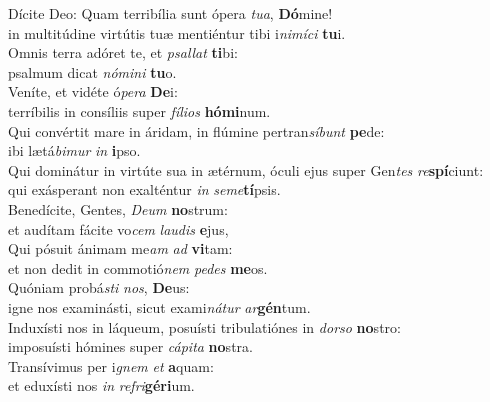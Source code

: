 \evenverse Dícite Deo: Quam terribília sunt ópera \textit{tu}\textit{a}, \textbf{Dó}mine!~\*\\
\evenverse in multitúdine virtútis tuæ mentiéntur tibi i\textit{ni}\textit{mí}\textit{ci} \textbf{tu}i.\\
\oddverse Omnis terra adóret te, et \textit{psal}\textit{lat} \textbf{ti}bi:~\*\\
\oddverse psalmum dicat \textit{nó}\textit{mi}\textit{ni} \textbf{tu}o.\\
\evenverse Veníte, et vidéte ó\textit{pe}\textit{ra} \textbf{De}i:~\*\\
\evenverse terríbilis in consíliis super \textit{fí}\textit{li}\textit{os} \textbf{hó}\textbf{mi}num.\\
\oddverse Qui convértit mare in áridam, in flúmine pertran\textit{sí}\textit{bunt} \textbf{pe}de:~\*\\
\oddverse ibi lætá\textit{bi}\textit{mur} \textit{in} \textbf{i}pso.\\
\evenverse Qui dominátur in virtúte sua in ætérnum, óculi ejus super Gen\textit{tes} \textit{re}\textbf{spí}ciunt:~\*\\
\evenverse qui exásperant non exalténtur \textit{in} \textit{se}\textit{me}\textbf{tí}psis.\\
\oddverse Benedícite, Gentes, \textit{De}\textit{um} \textbf{no}strum:~\*\\
\oddverse et audítam fácite vo\textit{cem} \textit{lau}\textit{dis} \textbf{e}jus,\\
\evenverse Qui pósuit ánimam me\textit{am} \textit{ad} \textbf{vi}tam:~\*\\
\evenverse et non dedit in commotió\textit{nem} \textit{pe}\textit{des} \textbf{me}os.\\
\oddverse Quóniam probá\textit{sti} \textit{nos}, \textbf{De}us:~\*\\
\oddverse igne nos examinásti, sicut exami\textit{ná}\textit{tur} \textit{ar}\textbf{gén}tum.\\
\evenverse Induxísti nos in láqueum, posuísti tribulatiónes in \textit{dor}\textit{so} \textbf{no}stro:~\*\\
\evenverse imposuísti hómines super \textit{cá}\textit{pi}\textit{ta} \textbf{no}stra.\\
\oddverse Transívimus per i\textit{gnem} \textit{et} \textbf{a}quam:~\*\\
\oddverse et eduxísti nos \textit{in} \textit{re}\textit{fri}\textbf{gé}\textbf{ri}um.\\
